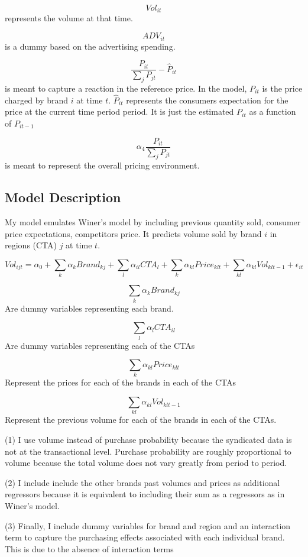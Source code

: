\documentclass{article}
\begin{document}
$$Vol_{it}$$ represents the volume at that time.

$$ADV_{it}$$ is a dummy based on the advertising spending.

$$\dfrac{P_{it}} {\sum_j P_{jt}} - \hat{P}_{it}$$ is meant to capture a reaction in the reference price.  In the model, $P_{it}$ is the price charged by brand $i$ at time $t$. $\hat{P}_{it}$ represents the consumers expectation for the price at the current time period period. It is just the estimated ${P}_{it}$ as a function of ${P}_{it-1}$ 

$$ \alpha_4 \dfrac {P_{it}}{\sum_j P_{jt}}$$ is meant to represent the overall pricing environment.

\subsection{Model Description}

My model emulates Winer's model by including previous quantity sold, consumer price expectations, competitors price. It predicts volume sold by brand $i$ in regions (CTA) $j$ at time $t$.

$$Vol_{ijt} = \alpha_0 + \sum_{k} \alpha_{k} Brand_{kj} + \sum_{l} \alpha_{il} CTA_{l} + \sum_{k} \alpha_{kl} Price_{klt} + \sum_{kl} \alpha_{kl} Vol_{klt-1} + \epsilon_{it}$$

$$\sum_{k} \alpha_{k} Brand_{kj}$$ Are dummy variables representing each brand.

$$\sum_{l} \alpha_{l} CTA_{il}$$ Are dummy variables representing each of the CTAs

$$\sum_{k} \alpha_{kl} Price_{klt}$$ Represent the prices for each of the brands in each of the CTAs

$$\sum_{kl} \alpha_{kl} Vol_{klt-1}$$ Represent the previous volume for each of the brands in each of the CTAs.

(1) I use volume instead of purchase probability because the syndicated data is not at the transactional level. Purchase probability are roughly proportional to volume because the total volume does not vary greatly from period to period. 

(2) I include include the other brands past volumes and prices as additional regressors because it is equivalent to including their sum as a regressors as in Winer's model. 

(3) Finally, I include dummy variables for brand and region and an interaction term to capture the purchasing effects associated with each individual brand. This is due to the absence of interaction terms
\end{document}
